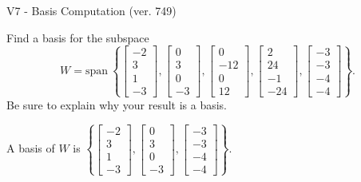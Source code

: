 \begin{exercise}
  \begin{exerciseTitle}V7 - Basis Computation (ver. 749)\end{exerciseTitle}
  \begin{exerciseStatement}
    Find a basis for the subspace 
\[W=\mathrm{span}\ \left\{\left[\begin{array}{r}
-2 \\
3 \\
1 \\
-3
\end{array}\right] , \left[\begin{array}{r}
0 \\
3 \\
0 \\
-3
\end{array}\right] , \left[\begin{array}{r}
0 \\
-12 \\
0 \\
12
\end{array}\right] , \left[\begin{array}{r}
2 \\
24 \\
-1 \\
-24
\end{array}\right] , \left[\begin{array}{r}
-3 \\
-3 \\
-4 \\
-4
\end{array}\right]\right\}.\]
 Be sure to explain why your result is a basis.


  \end{exerciseStatement}
  \begin{exerciseAnswer}
   A basis of \(W\) is  \(\left\{\left[\begin{array}{r}
-2 \\
3 \\
1 \\
-3
\end{array}\right] , \left[\begin{array}{r}
0 \\
3 \\
0 \\
-3
\end{array}\right] , \left[\begin{array}{r}
-3 \\
-3 \\
-4 \\
-4
\end{array}\right]\right\}\).
  


  \end{exerciseAnswer}
\end{exercise}